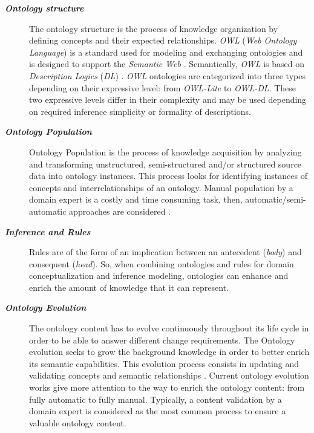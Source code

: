 		\begin{description}
			\item[\textbf{\textit{Ontology structure}}]
			The ontology structure is the process of knowledge organization 
			by defining concepts and their expected relationships. 
			\emph{OWL} (\emph{Web Ontology Language}) is a standard used for
			modeling and exchanging ontologies and is designed to support the \emph{Semantic Web} 
			\citep{Staab2009}. Semantically, \emph{OWL} is based on \emph{Description Logics} 
			(\emph{DL}) \citep{Baader2003}. \emph{OWL} ontologies are categorized into three types
			depending on their expressive level: from \emph{OWL-Lite} to \emph{OWL-DL}.
			These two expressive levels differ in their 
			complexity and may be used depending on required inference simplicity or 
			formality of descriptions.

			\item[\textbf{\textit{Ontology Population}}]
			Ontology Population is the process of knowledge acquisition by analyzing and 
			transforming unstructured, 
			semi-structured and/or structured source data into ontology instances. 
			This process looks for identifying instances of concepts and interrelationships 
			of an ontology. Manual population by a domain expert is a costly and time consuming 
			task, then, automatic/semi-automatic approaches are considered 
			\citep{Song2009, Faria2011}.
	
			\item[\textbf{\textit{Inference and Rules}}] Rules are of the form of an implication between 
			an antecedent (\emph{body}) and consequent (\emph{head}). So, when combining 
			ontologies and rules for domain conceptualization and inference modeling, 
			ontologies can enhance and enrich the amount of knowledge that it can represent.

			\item[\textbf{\textit{Ontology Evolution}}]
			The ontology content has to evolve continuously throughout its 
			life cycle in order to be able to answer different change requirements. 
			The Ontology evolution seeks to grow the background knowledge in order to 
			better enrich its semantic capabilities. This evolution process consists 
			in updating and validating concepts and semantic relationships
			\citep{Gargouri2010, Paliouras2011b, Petasis2011}.
			Current ontology evolution works 
			give more attention to the way to enrich the ontology content: 
			from fully automatic to fully manual.
			Typically, a content validation by a domain expert  is considered as the most
			common process to ensure a valuable ontology content.
		\end{description}

